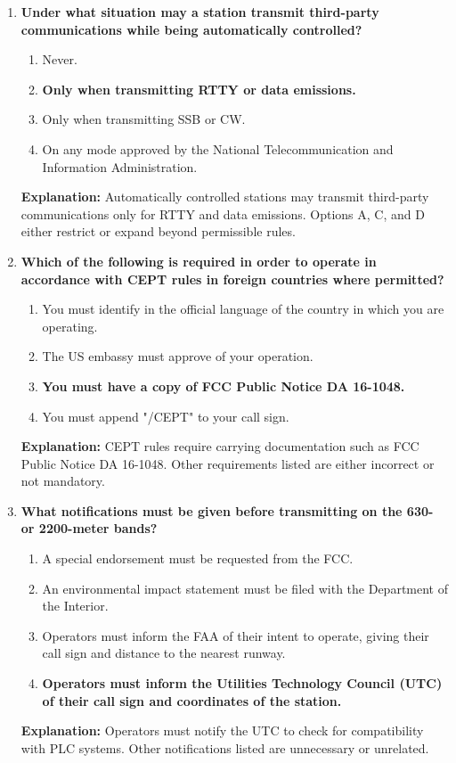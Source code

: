 \begin{enumerate}
    \item \textbf{Under what situation may a station transmit third-party communications while being automatically controlled?}
    \begin{enumerate}
        \item Never.\\
        \item \textbf{Only when transmitting RTTY or data emissions.}\\
        \item Only when transmitting SSB or CW.\\
        \item On any mode approved by the National Telecommunication and Information Administration.
    \end{enumerate}
    \textbf{Explanation:} Automatically controlled stations may transmit third-party communications only for RTTY and data emissions. Options A, C, and D either restrict or expand beyond permissible rules.

    \item \textbf{Which of the following is required in order to operate in accordance with CEPT rules in foreign countries where permitted?}
    \begin{enumerate}
        \item You must identify in the official language of the country in which you are operating.\\
        \item The US embassy must approve of your operation.\\
        \item \textbf{You must have a copy of FCC Public Notice DA 16-1048.}\\
        \item You must append "/CEPT" to your call sign.
    \end{enumerate}
    \textbf{Explanation:} CEPT rules require carrying documentation such as FCC Public Notice DA 16-1048. Other requirements listed are either incorrect or not mandatory.

    \item \textbf{What notifications must be given before transmitting on the 630- or 2200-meter bands?}
    \begin{enumerate}
        \item A special endorsement must be requested from the FCC.\\
        \item An environmental impact statement must be filed with the Department of the Interior.\\
        \item Operators must inform the FAA of their intent to operate, giving their call sign and distance to the nearest runway.\\
        \item \textbf{Operators must inform the Utilities Technology Council (UTC) of their call sign and coordinates of the station.}
    \end{enumerate}
    \textbf{Explanation:} Operators must notify the UTC to check for compatibility with PLC systems. Other notifications listed are unnecessary or unrelated.


\end{enumerate}

